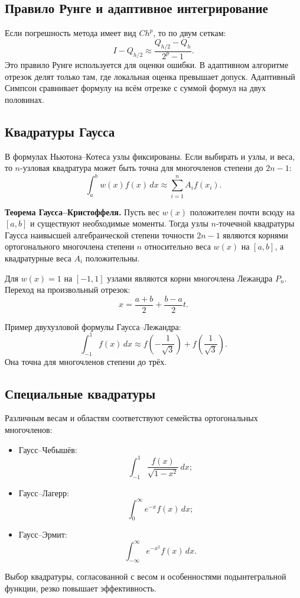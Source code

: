 \subsection{Правило Рунге и адаптивное интегрирование}

Если погрешность метода имеет вид $Ch^p$, то по двум сеткам:
\[
    I-Q_{h/2}\approx\frac{Q_{h/2}-Q_h}{2^p-1}.
\]
Это правило Рунге используется для оценки ошибки. В адаптивном алгоритме отрезок
делят только там, где локальная оценка превышает допуск. Адаптивный Симпсон
сравнивает формулу на всём отрезке с суммой формул на двух половинах.

\subsection{Квадратуры Гаусса}

В формулах Ньютона--Котеса узлы фиксированы. Если выбирать и узлы, и веса, то
$n$-узловая квадратура может быть точна для многочленов степени до $2n-1$:
\[
    \int_a^b w(x)f(x)\,dx
    \approx \sum_{i=1}^{n}A_i f(x_i).
\]

\textbf{Теорема Гаусса--Кристоффеля.}
Пусть вес $w(x)$ положителен почти всюду на $[a,b]$ и существуют необходимые
моменты. Тогда узлы $n$-точечной квадратуры Гаусса наивысшей алгебраической
степени точности $2n-1$ являются корнями ортогонального многочлена степени $n$
относительно веса $w(x)$ на $[a,b]$, а квадратурные веса $A_i$ положительны.

Для $w(x)=1$ на $[-1,1]$ узлами являются корни многочлена Лежандра $P_n$.
Переход на произвольный отрезок:
\[
    x=\frac{a+b}{2}+\frac{b-a}{2}t.
\]

Пример двухузловой формулы Гаусса--Лежандра:
\[
    \int_{-1}^{1}f(x)\,dx
    \approx
    f\left(-\frac1{\sqrt3}\right)
    +f\left(\frac1{\sqrt3}\right).
\]
Она точна для многочленов степени до трёх.

\subsection{Специальные квадратуры}

Различным весам и областям соответствуют семейства ортогональных многочленов:
\begin{itemize}
    \item Гаусс--Чебышёв:
    \[
        \int_{-1}^{1}\frac{f(x)}{\sqrt{1-x^2}}\,dx;
    \]
    \item Гаусс--Лагерр:
    \[
        \int_{0}^{\infty}e^{-x}f(x)\,dx;
    \]
    \item Гаусс--Эрмит:
    \[
        \int_{-\infty}^{\infty}e^{-x^2}f(x)\,dx.
    \]
\end{itemize}
Выбор квадратуры, согласованной с весом и особенностями подынтегральной функции,
резко повышает эффективность.

